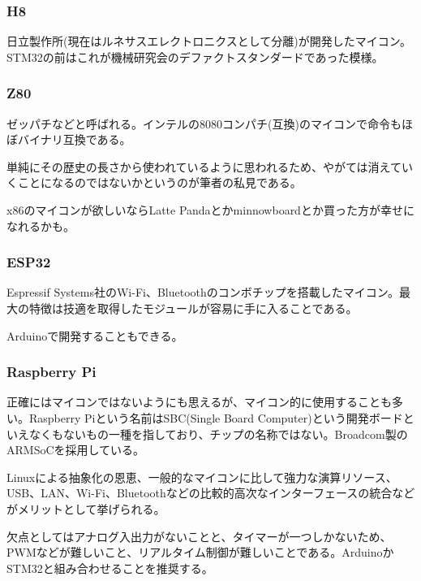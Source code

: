 \documentclass[a4paper,titlepage]{ujarticle}
\begin{document}
\subsubsection{H8}
日立製作所(現在はルネサスエレクトロニクスとして分離)が開発したマイコン。STM32の前はこれが機械研究会のデファクトスタンダードであった模様。
\subsubsection{Z80}
ゼッパチなどと呼ばれる。インテルの8080コンパチ(互換)のマイコンで命令もほぼバイナリ互換である。

単純にその歴史の長さから使われているように思われるため、やがては消えていくことになるのではないかというのが筆者の私見である。

x86のマイコンが欲しいならLatte Pandaとかminnowboardとか買った方が幸せになれるかも。
\subsubsection{ESP32}
Espressif Systems社のWi-Fi、Bluetoothのコンボチップを搭載したマイコン。最大の特徴は技適を取得したモジュールが容易に手に入ることである。

Arduinoで開発することもできる。
\subsubsection{Raspberry Pi}
正確にはマイコンではないようにも思えるが、マイコン的に使用することも多い。Raspberry Piという名前はSBC(Single Board Computer)という開発ボードといえなくもないもの一種を指しており、チップの名称ではない。Broadcom製のARMSoCを採用している。

Linuxによる抽象化の恩恵、一般的なマイコンに比して強力な演算リソース、USB、LAN、Wi-Fi、Bluetoothなどの比較的高次なインターフェースの統合などがメリットとして挙げられる。

欠点としてはアナログ入出力がないことと、タイマーが一つしかないため、PWMなどが難しいこと、リアルタイム制御が難しいことである。ArduinoかSTM32と組み合わせることを推奨する。
\end{document}
